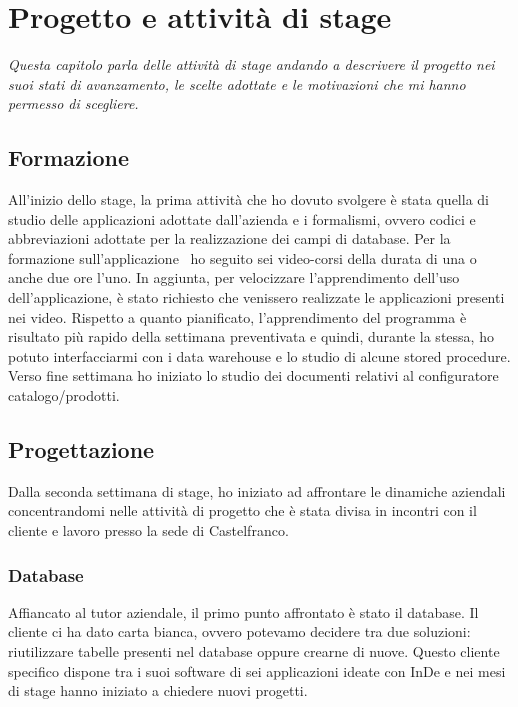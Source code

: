 \chapter{Progetto e attività di stage}
\textit{Questa capitolo parla delle attività di stage andando a descrivere il progetto nei suoi stati di avanzamento, le scelte adottate e le motivazioni che mi hanno permesso di scegliere.}

\section{Formazione}
All'inizio dello stage, la prima attività che ho dovuto svolgere è stata quella di studio delle applicazioni adottate dall'azienda e i formalismi, ovvero codici e abbreviazioni adottate per la realizzazione dei campi di database. 
Per la formazione sull'applicazione \inde\, ho seguito sei video-corsi della durata di una o anche due ore l'uno. In aggiunta, per velocizzare l'apprendimento dell'uso dell'applicazione, è stato richiesto che venissero realizzate le applicazioni presenti nei video.
Rispetto a quanto pianificato, l'apprendimento del programma è risultato più rapido della settimana preventivata e quindi, durante la stessa, ho potuto interfacciarmi con i data warehouse e lo studio di alcune stored procedure. 
Verso fine settimana ho iniziato lo studio dei documenti relativi al configuratore catalogo/prodotti.


\section{Progettazione}
Dalla seconda settimana di stage, ho iniziato ad affrontare le dinamiche aziendali concentrandomi nelle attività di progetto che è stata divisa in incontri con il cliente e lavoro presso la sede di Castelfranco.

\subsection{Database}
Affiancato al tutor aziendale, il primo punto affrontato è stato il database. Il cliente ci ha dato carta bianca, ovvero potevamo decidere tra due soluzioni: riutilizzare tabelle presenti nel database oppure crearne di nuove. Questo cliente specifico dispone tra i suoi software di sei applicazioni ideate con InDe e nei mesi di stage hanno iniziato a chiedere nuovi progetti.


